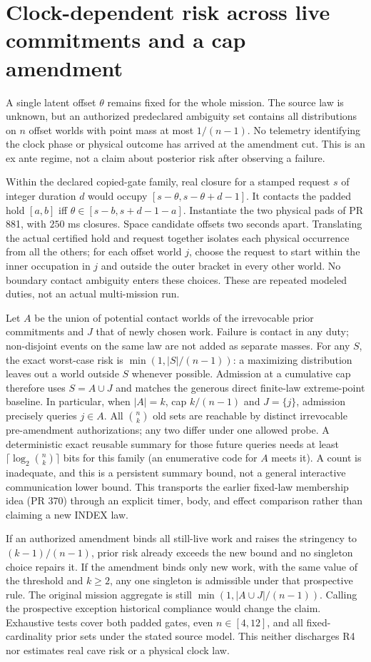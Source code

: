 \documentclass{article}
\begin{document}
\section*{Clock-dependent risk across live commitments and a cap amendment}
A single latent offset $\theta$ remains fixed for the whole mission.
The source law is unknown, but an authorized predeclared ambiguity set
contains all distributions on $n$ offset worlds with point mass at
most $1/(n-1)$. No telemetry identifying the clock phase or physical
outcome has arrived at the amendment cut. This is an ex ante regime,
not a claim about posterior risk after observing a failure.

Within the declared copied-gate family, real closure for a stamped
request $s$ of integer duration $d$ would occupy
$[s-\theta,s-\theta+d-1]$. It contacts the padded hold $[a,b]$ iff
$\theta\in[s-b,s+d-1-a]$. Instantiate the two physical pads of
PR 881, with $250$ ms closures. Space candidate offsets two
seconds apart. Translating the actual certified hold and request
together isolates each physical occurrence from all the others;
for each offset world $j$, choose the request to start within the
inner occupation in $j$ and outside the outer bracket in every
other world. No boundary contact ambiguity enters these choices.
These are repeated modeled duties, not an actual multi-mission run.

Let $A$ be the union of potential contact worlds of the irrevocable
prior commitments and $J$ that of newly chosen work. Failure is
contact in any duty; non-disjoint events on the same law are not
added as separate masses. For any $S$, the exact worst-case risk is
$\min(1,|S|/(n-1))$: a maximizing distribution leaves out a world
outside $S$ whenever possible. Admission at a cumulative cap
therefore uses $S=A\cup J$ and matches the generous direct
finite-law extreme-point baseline. In particular, when $|A|=k$,
cap $k/(n-1)$ and $J=\{j\}$, admission precisely queries $j\in A$.
All $\binom{n}{k}$ old sets are reachable by distinct irrevocable
pre-amendment authorizations; any two differ under one allowed
probe. A deterministic exact reusable summary for those future
queries needs at least $\lceil\log_2\binom{n}{k}\rceil$ bits for
this family (an enumerative code for $A$ meets it). A count is
inadequate, and this is a persistent summary bound, not a general
interactive communication lower bound. This transports the earlier
fixed-law membership idea (PR 370) through an explicit timer,
body, and effect comparison rather than claiming a new INDEX law.

If an authorized amendment binds all still-live work and raises
the stringency to $(k-1)/(n-1)$, prior risk already exceeds the new
bound and no singleton choice repairs it. If the amendment binds
only new work, with the same value of the threshold and $k\ge2$,
any one singleton is admissible under that prospective rule. The
original mission aggregate is still $\min(1,|A\cup J|/(n-1))$.
Calling the prospective exception historical compliance would
change the claim. Exhaustive tests cover both padded gates, even
$n\in[4,12]$, and all fixed-cardinality prior sets under the stated
source model. This neither discharges R4 nor estimates real cave
risk or a physical clock law.
\end{document}
